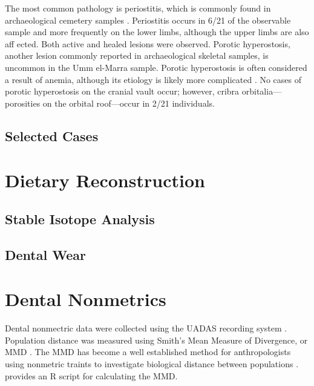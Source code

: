 \documentclass[]{book}
\begin{document}
The most common pathology is periostitis, which is commonly found in
archaeological cemetery samples \citep{ortner2003identification}.
Periostitis occurs in 6/21 of the observable sample and more frequently
on the lower limbs, although the upper limbs are also aff ected. Both
active and healed lesions were observed. Porotic hyperostosis, another
lesion commonly reported in archaeological skeletal samples, is uncommon
in the Umm el-Marra sample. Porotic hyperostosis is often considered a
result of anemia, although its etiology is likely more complicated
\citep{walker2009causes}. No cases of porotic hyperostosis on the
cranial vault occur; however, cribra orbitalia---porosities on the
orbital roof---occur in 2/21 individuals.

\subsection{Selected Cases}\label{selected-cases}

\section{Dietary Reconstruction}\label{dietary-reconstruction}

\subsection{Stable Isotope Analysis}\label{stable-isotope-analysis}

\subsection{Dental Wear}\label{dental-wear}

\section{Dental Nonmetrics}\label{dental-nonmetrics}

Dental nonmectric data were collected using the UADAS recording system
\citep{scott2000anthteeth}. Population distance was measured using
Smith's Mean Measure of Divergence, or MMD \citep{smith1977note}. The
MMD has become a well established method for anthropologists using
nonmetric traints to investigate biological distance between populations
\citep{harris2004calculation}. \citet{soltysiak2011mmd} provides an R
script for calculating the MMD.
\end{document}
